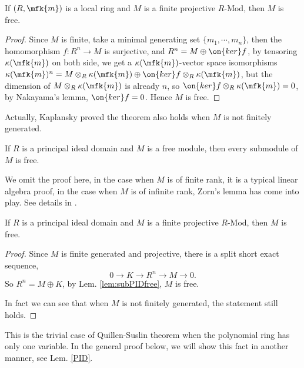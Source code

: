 \begin{thm}\label{thm:freenessOnLocal}
	If $(R,\mfk{m})$ is a local ring and $M$ is a finite projective $R$-Mod, then $M$ is free.
\end{thm}
\begin{proof}
	Since $M$ is finite, take a minimal generating set $\{m_1,\cdots,m_n\}$, then the homomorphism $f:R^n\rightarrow M$ is surjective, and $R^n=M\oplus\on{ker}f$, by tensoring $\kappa(\mfk{m})$ on both side, we get a $\kappa(\mfk{m})$-vector space isomorphisms $\kappa(\mfk{m})^n=M\otimes_R\kappa(\mfk{m}) \oplus \on{ker}f\otimes_R\kappa(\mfk{m})$, but the dimension of $M\otimes_R\kappa(\mfk{m})$ is already $n$, so $\on{ker}f\otimes_R\kappa(\mfk{m})=0$, by Nakayama's lemma, $\on{ker}f=0$. Hence $M$ is free.
\end{proof}
\begin{rmk}
	Actually, Kaplansky proved the theorem also holds when $M$ is not finitely generated.
\end{rmk}

\begin{lem}\label{lem:subPIDfree}
	If $R$ is a principal ideal domain and $M$ is a free module, then every submodule of $M$ is free.
\end{lem}
\begin{rmk}
	We omit the proof here, in the case when $M$ is of finite rank, it is a typical linear algebra proof, in the case when $M$ is of infinite rank, Zorn's lemma has come into play. See details in \cite{Lang2002}.
\end{rmk}

\begin{thm}\label{thm:freenessonPID}
	If $R$ is a principal ideal domain and $M$ is a finite projective $R$-Mod, then $M$ is free.
\end{thm}
\begin{proof}
	Since $M$ is finite generated and projective, there is a split short exact sequence,
	$$
	0\rightarrow K\rightarrow R^n\rightarrow M\rightarrow 0.
	$$
	So $R^n = M\oplus K$, by Lem. \ref{lem:subPIDfree}, $M$ is free.
	
	In fact we can see that when $M$ is not finitely generated, the statement still holds.
\end{proof}
\begin{rmk}
	This is the trivial case of Quillen-Suslin theorem when the polynomial ring has only one variable. In the general proof below, we will show this fact in another manner, see Lem. \ref{PID}.
\end{rmk}

